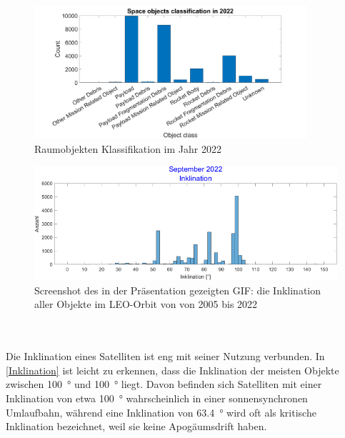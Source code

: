 \documentclass{article}
\begin{document}
\begin{figure}[ht]\centering 
	\includegraphics[width=0.9\textwidth]{images/obj_classification.png}
	\caption{Raumobjekten Klassifikation im Jahr 2022}
	\label{fig:objectclassification}
\end{figure}
\begin{figure}[htbp]
\centering
\includegraphics[width=1\textwidth]{bilder/Inklination.png}
\caption{Screenshot des in der Präsentation gezeigten GIF: die Inklination aller Objekte im LEO-Orbit von von 2005 bis 2022}
\label{Inklination}
\end{figure}\\\\
\noindent Die Inklination eines Satelliten ist eng mit seiner Nutzung verbunden. In \autoref{Inklination} ist leicht zu erkennen, dass die Inklination der meisten Objekte zwischen \SI{100}{\degree} und \SI{100}{\degree} liegt. Davon befinden sich Satelliten mit einer Inklination von etwa \SI{100}{\degree} wahrscheinlich in einer sonnensynchronen Umlaufbahn, während eine Inklination von \SI{63,4}{\degree} wird oft als kritische Inklination bezeichnet, weil sie keine Apogäumsdrift haben.
\clearpage
\end{document}
